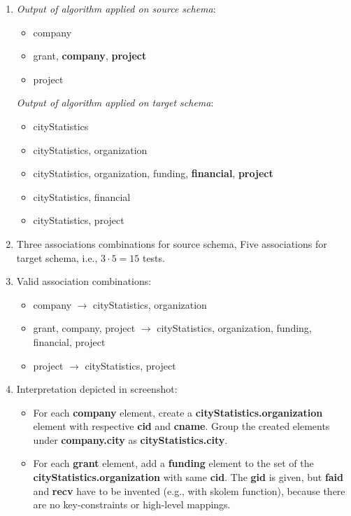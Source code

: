 \documentclass{scrartcl}
\begin{document}
\begin{enumerate}
		\item \textit{Output of algorithm applied on source schema}:
		\begin{itemize}
			\item company
			\item grant, \textbf{company}, \textbf{project}
			\item project
		\end{itemize}
		
		\textit{Output of algorithm applied on target schema}:
		\begin{itemize}
			\item cityStatistics
			\item cityStatistics, organization
			\item cityStatistics, organization, funding, \textbf{financial}, \textbf{project}
			\item cityStatistics, financial
			\item cityStatistics, project
		\end{itemize}
		
		\item Three associations combinations for source schema, Five associations for target schema, i.e., $3\cdot5=15$ tests.
		
		\item Valid association combinations:
		\begin{itemize}
			\item company $\to$ cityStatistics, organization
			\item grant, company, project $\to$ cityStatistics, organization, funding, financial, project
			\item project $\to$ cityStatistics, project
		\end{itemize}
		
		\item Interpretation depicted in screenshot:
		\begin{itemize}
			\item For each \textbf{company} element, create a \textbf{cityStatistics.organization} element with respective \textbf{cid} and \textbf{cname}.
			Group the created elements under \textbf{company.city} as \textbf{cityStatistics.city}.
			
			\item For each \textbf{grant} element, add a \textbf{funding} element to the set of the \textbf{cityStatistics.organization} with same \textbf{cid}.
			The \textbf{gid} is given, but \textbf{faid} and \textbf{recv} have to be invented (e.g., with skolem function), because there are no key-constraints or high-level mappings.
			

\end{itemize}
\end{enumerate}
\end{document}
